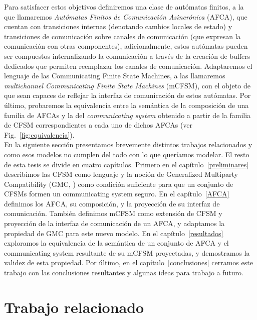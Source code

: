 Para satisfacer estos objetivos definiremos una clase de autómatas finitos, a la que llamaremos \emph{Autómatas Finitos de Comunicación Asincrónica} (AFCA), que cuentan con transiciones internas (denotando cambios locales de estado) y transiciones de comunicación sobre canales de comunicación (que expresan la comunicación con otras componentes), adicionalmente, estos autómatas pueden ser compuestos internalizando la comunicación a través de la creación de buffers dedicados que permiten reemplazar los canales de comunicación. Adaptaremos el lenguaje de las Communicating Finite State Machines, a las llamaremos \emph{multichannel Communicating Finite State Machines} (mCFSM), con el objeto de que sean capaces de reflejar la interfaz de comunicación de estos autómatas. Por último, probaremos la equivalencia entre la semántica de la composición de una familia de AFCAs y la del \emph{communicating system} obtenido a partir de la familia de CFSM correspondientes a cada uno de dichos AFCAs (ver Fig.~\ref{fig:equivalencia}).\\

En la siguiente sección presentamos brevemente distintos trabajos relacionados y como esos modelos no cumplen del todo con lo que queríamos modelar. El resto de esta tesis se divide en cuatro capítulos. Primero en el capítulo~\ref{preliminares} describimos las CFSM como lenguaje y la noción de Generalized Multiparty Compatibility (GMC, \cite{lange:popl15}) como condición suficiente para que un conjunto de CFSMs formen un communicating system seguro. En el capítulo~\ref{AFCA} definimos los AFCA, su composición, y la proyección de su interfaz de comunicación. También definimos mCFSM como extensión de CFSM y proyección de la interfaz de comunicación de un AFCA, y adaptamos la propiedad de GMC para este nuevo modelo. En el capítulo~\ref{resultados} exploramos la equivalencia de la semántica de un conjunto de AFCA y el communicating system resultante de su mCFSM proyectadas, y demostramos la validez de esta propiedad. Por último, en el capítulo~\ref{conclusiones} cerramos este trabajo con las conclusiones resultantes y algunas ideas para trabajo a futuro.


\section{Trabajo relacionado}
\label{trabajo-relacionado}

